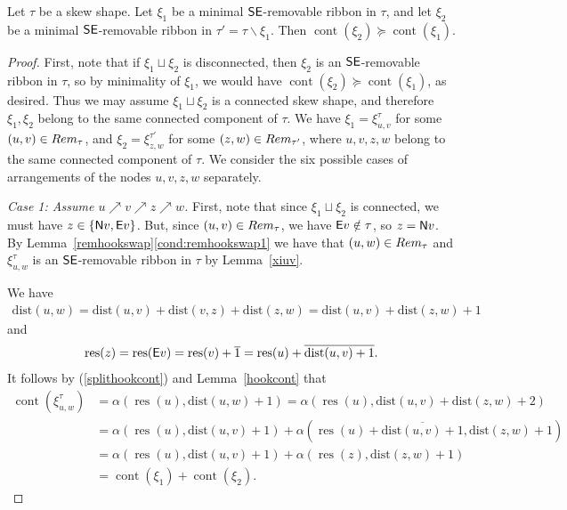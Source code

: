 \documentclass[Unicode,ALCO]{cedram}
\newcommand{\res}{\operatorname{res}}
\newcommand{\0}{{\bar 0}}
\newcommand{\dist}{{\mathrm {dist}}}
\newcommand{\no}{{\sf N}}
\newcommand{\ea}{{\sf E}}
\newcommand{\ssee}{{\sf SE}}
\def\cont{{\operatorname{cont}}}
\begin{document}
 \begin{lemma}\label{remsinorder}
Let \(\tau\) be a skew shape. Let \(\xi_1\) be a minimal \(\ssee\)-removable ribbon in \(\tau\), and let \(\xi_2\) be a minimal \(\ssee\)-removable ribbon in \(\tau'=\tau\backslash \xi_1\). Then \(\cont(\xi_2) \succeq \cont(\xi_1)\).
 \end{lemma}
 \begin{proof}
First, note that if \(\xi_1 \sqcup \xi_2\) is disconnected, then \(\xi_2\) is an \(\ssee\)-removable ribbon in \(\tau\), so by minimality of \(\xi_1\), we would have \(\cont(\xi_2) \succeq \cont(\xi_1)\), as desired. Thus we may assume \(\xi_1 \sqcup \xi_2\) is a connected skew shape, and therefore \(\xi_1, \xi_2\) belong to the same connected component of \(\tau\). 
  We have \(\xi_1 = \xi^\tau_{u,v}\) for some \((u,v) \in \textup{Rem}_\tau\), and \(\xi_2 = \xi^{\tau'}_{z,w}\) for some \((z,w) \in \textup{Rem}_{\tau'}\), where \(u,v,z,w\) belong to the same connected component of \(\tau\).  
We consider the six possible cases of arrangements of the nodes \(u,v,z,w\) separately.
 
 {\em Case 1: Assume \(u \nearrow v \nearrow z \nearrow w\).} First, note that since \(\xi_1 \sqcup \xi_2\) is connected, we must have \(z \in \{\no v, \ea v\}\). But, since \((u,v) \in \textup{Rem}_\tau\), we have \(\ea v \notin \tau\), so \(z=\no v\). 
By Lemma~\ref{remhookswap}\eqref{cond:remhookswap1} we have that \((u,w) \in \textup{Rem}_\tau\) and \(\xi^\tau_{u,w}\) is an \(\ssee\)-removable ribbon in \(\tau\) by Lemma~\ref{xiuv}.
 
We have
\begin{align*}
\dist(u,w) = 
\dist(u,v) + \dist(v,z) + \dist(z,w) = 
 \dist(u,v) + \dist(z,w) + 1
\end{align*}
and
\begin{align*}
\res(z) = \res(\ea v) = \res(v) + \overline{1} = \res(u) + \overline{\dist(u,v) + 1}.
\end{align*}
It follows by (\ref{splithookcont}) and Lemma~\ref{hookcont} that 
\begin{align*}
\cont(\xi^\tau_{u,w}) &= \alpha(\res(u), \dist(u,w)+1) = \alpha(\res(u),  \dist(u,v) + \dist(z,w) + 2)\\
&= \alpha(\res(u), \dist(u,v)+1) + \alpha(\res(u) + \overline{\dist(u,v)+1}, \dist(z,w)+1)\\
&= \alpha(\res(u),  \dist(u,v)+1) + \alpha(\res(z), \dist(z,w)+1)\\
&= \cont(\xi_1) + \cont(\xi_2).
\end{align*}


\end{proof}
\end{document}
